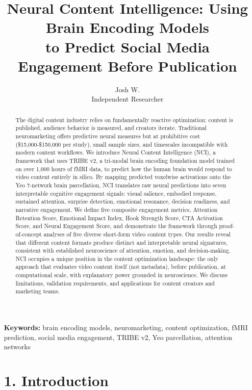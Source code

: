 \documentclass[11pt,letterpaper]{article}
\title{Neural Content Intelligence: Using Brain Encoding Models\\to Predict Social Media Engagement Before Publication}
\author{Josh W.\\Independent Researcher}
\date{}
\begin{document}
\maketitle

\begin{abstract}
The digital content industry relies on fundamentally reactive optimization: content is published, audience behavior is measured, and creators iterate. Traditional neuromarketing offers predictive neural measures but at prohibitive cost (\$15,000-\$150,000 per study), small sample sizes, and timescales incompatible with modern content workflows. We introduce Neural Content Intelligence (NCI), a framework that uses TRIBE v2, a tri-modal brain encoding foundation model trained on over 1,000 hours of fMRI data, to predict how the human brain would respond to video content entirely in silico. By mapping predicted voxelwise activations onto the Yeo 7-network brain parcellation, NCI translates raw neural predictions into seven interpretable cognitive engagement signals: visual salience, embodied response, sustained attention, surprise detection, emotional resonance, decision readiness, and narrative engagement. We define five composite engagement metrics, Attention Retention Score, Emotional Impact Index, Hook Strength Score, CTA Activation Score, and Neural Engagement Score, and demonstrate the framework through proof-of-concept analyses of five diverse short-form video content types. Our results reveal that different content formats produce distinct and interpretable neural signatures, consistent with established neuroscience of attention, emotion, and decision-making. NCI occupies a unique position in the content optimization landscape: the only approach that evaluates video content itself (not metadata), before publication, at computational scale, with explanatory power grounded in neuroscience. We discuss limitations, validation requirements, and applications for content creators and marketing teams.
\end{abstract}

\noindent\textbf{Keywords:} brain encoding models, neuromarketing, content optimization, fMRI prediction, social media engagement, TRIBE v2, Yeo parcellation, attention networks

\bigskip




\section{1. Introduction}
\end{document}
